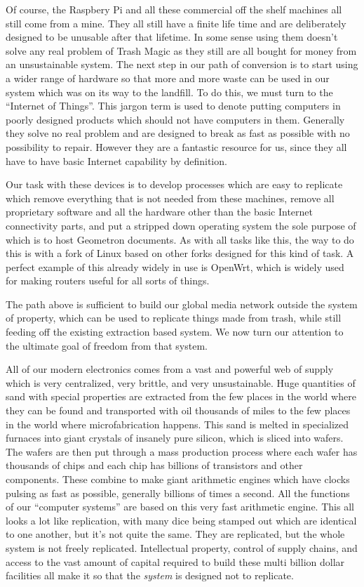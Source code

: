 Of course, the Raspbery Pi and all these commercial off the shelf
machines all still come from a mine. They all still have a finite life
time and are deliberately designed to be unusable after that lifetime.
In some sense using them doesn't solve any real problem of Trash Magic
as they still are all bought for money from an unsustainable system. The
next step in our path of conversion is to start using a wider range of
hardware so that more and more waste can be used in our system which was
on its way to the landfill. To do this, we must turn to the ``Internet
of Things''. This jargon term is used to denote putting computers in
poorly designed products which should not have computers in them.
Generally they solve no real problem and are designed to break as fast
as possible with no possibility to repair. However they are a fantastic
resource for us, since they all have to have basic Internet capability
by definition.

Our task with these devices is to develop processes which are easy to
replicate which remove everything that is not needed from these
machines, remove all proprietary software and all the hardware other
than the basic Internet connectivity parts, and put a stripped down
operating system the sole purpose of which is to host Geometron
documents. As with all tasks like this, the way to do this is with a
fork of Linux based on other forks designed for this kind of task. A
perfect example of this already widely in use is OpenWrt, which is
widely used for making routers useful for all sorts of things.

The path above is sufficient to build our global media network outside
the system of property, which can be used to replicate things made from
trash, while still feeding off the existing extraction based system. We
now turn our attention to the ultimate goal of freedom from that system.

All of our modern electronics comes from a vast and powerful web of
supply which is very centralized, very brittle, and very unsustainable.
Huge quantities of sand with special properties are extracted from the
few places in the world where they can be found and transported with oil
thousands of miles to the few places in the world where microfabrication
happens. This sand is melted in specialized furnaces into giant crystals
of insanely pure silicon, which is sliced into wafers. The wafers are
then put through a mass production process where each wafer has
thousands of chips and each chip has billions of transistors and other
components. These combine to make giant arithmetic engines which have
clocks pulsing as fast as possible, generally billions of times a
second. All the functions of our ``computer systems'' are based on this
very fast arithmetic engine. This all looks a lot like replication, with
many dice being stamped out which are identical to one another, but it's
not quite the same. They are replicated, but the whole system is not
freely replicated. Intellectual property, control of supply chains, and
access to the vast amount of capital required to build these multi
billion dollar facilities all make it so that the \emph{system} is
designed not to replicate.

